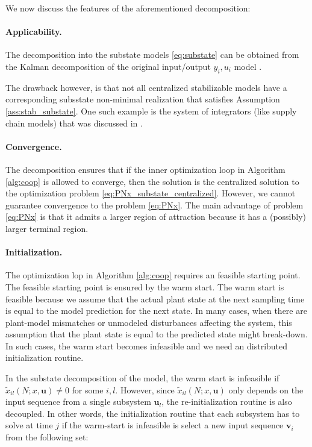 \documentclass[10pt]{article}
\newcommand{\bu}{\mathbf{u}}
\theoremstyle{definition}
\begin{document}
We now discuss the features of the aforementioned decomposition:

\paragraph{Applicability.} The decomposition into the substate models
\eqref{eq:substate} can be obtained from the Kalman decomposition of
the original input/output $y_i,u_i$ model
\citep[p.270]{antsaklis:michel:1997}.

The drawback however, is that not all centralized stabilizable models
have a corresponding subsstate non-minimal realization that satisfies
Assumption \ref{ass:stab_substate}. One such example is the system of
integrators (like supply chain models) that was discussed in
\citet{subramanian:rawlings:maravelias:2012}.

\paragraph{Convergence.} The decomposition ensures that if the inner
optimization loop in Algorithm \ref{alg:coop} is allowed to converge,
then the solution is the centralized solution to the optimization
problem \eqref{eq:PNx_substate_centralized}. However, we cannot
guarantee convergence to the problem \eqref{eq:PNx}. The main
advantage of problem \eqref{eq:PNx} is that it admits a larger region
of attraction because it has a (possibly) larger terminal region.

\paragraph{Initialization.} The optimization lop in Algorithm
\ref{alg:coop} requires an feasible starting point. The feasible
starting point is ensured by the warm start. The warm start
is feasible because we assume that the actual plant state at the next
sampling time is equal to the model prediction for the next state. In
many cases, when there are plant-model mismatches or unmodeled
disturbances affecting the system, this assumption that the plant
state is equal to the predicted state might break-down. In such cases,
the warm start becomes infeasible and we need an distributed
initialization routine.

In the substate decomposition of the model, the warm start is
infeasible if $\tilde{x}_{il}(N;x,\bu) \neq 0$ for some
$i,l$. However, since $\tilde{x}_{il}(N;x,\bu)$ only depends on the
input sequence from a single subsystem $\bu_l$, the re-initialization
routine is also decoupled. In other words, the initialization routine
that each subsystem has to solve at time $j$ if the warm-start is
infeasible is select a new input sequence $\mathbf{v}_i$ from the
following set:
\end{document}
